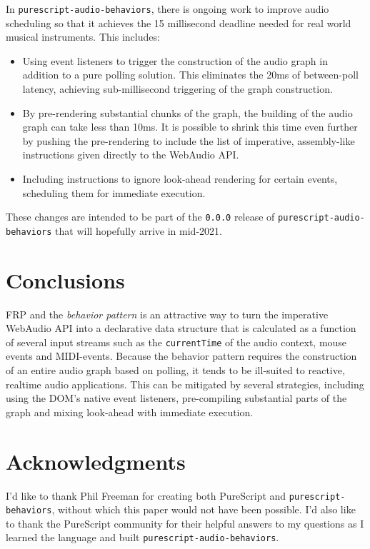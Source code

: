 \documentclass{sig-alternate}
\begin{document}
\begin{sloppypar}
  In \texttt{purescript-audio-behaviors}, there is ongoing work to improve audio scheduling so that it achieves the 15 millisecond deadline needed for real world musical instruments.  This includes:

  \begin{itemize}
    \item Using event listeners to trigger the construction of the audio graph in addition to a pure polling solution. This eliminates the 20ms of between-poll latency, achieving sub-millisecond triggering of the graph construction.
    \item By pre-rendering substantial chunks of the graph, the building of the audio graph can take less than 10ms.  It is possible to shrink this time even further by pushing the pre-rendering to include the list of imperative, assembly-like instructions given directly to the WebAudio API.
    \item Including instructions to ignore look-ahead rendering for certain events, scheduling them for immediate execution.
  \end{itemize}

  These changes are intended to be part of the \texttt{0.0.0} release of \texttt{purescript-audio-behaviors} that will hopefully arrive in mid-2021.

  \section{Conclusions}
  FRP and the \textit{behavior pattern} is an attractive way to turn the imperative WebAudio API into a declarative data structure that is calculated as a function of several input streams such as the \verb=currentTime= of the audio context, mouse events and MIDI-events.  Because the behavior pattern requires the construction of an entire audio graph based on polling, it tends to be ill-suited to reactive, realtime audio applications.  This can be mitigated by several strategies, including using the DOM's native event listeners, pre-compiling substantial parts of the graph and mixing look-ahead with immediate execution.

  \section{Acknowledgments}
  I'd like to thank Phil Freeman for creating both PureScript and \texttt{purescript-behaviors}, without which this paper would not have been possible.  I'd also like to thank the PureScript community for their helpful answers to my questions as I learned the language and built \texttt{purescript-audio-behaviors}.

  

\end{sloppypar}
\end{document}

